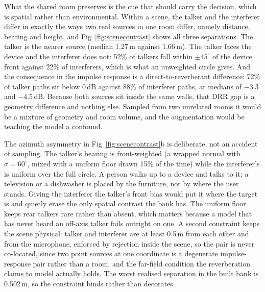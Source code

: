 \documentclass{article}
\begin{document}
What the shared room preserves is the cue that should carry the decision, which is spatial rather than environmental. Within a scene, the talker and the interferer differ in exactly the ways two real sources in one room differ, namely distance, bearing and height, and Fig~\ref{fig:scenecontrast} shows all three separations. The talker is the nearer source (median 1.27\,m against 1.66\,m). The talker faces the device and the interferer does not: 52\% of talkers fall within $\pm 45^\circ$ of the device front against 22\% of interferers, which is what an unweighted circle gives. And the consequence in the impulse response is a direct-to-reverberant difference: 72\% of talker paths sit below 0\,dB against 88\% of interferer paths, at medians of $-3.3$ and $-4.5$\,dB. Because both sources sit inside the same walls, that DRR gap is a geometry difference and nothing else. Sampled from two unrelated rooms it would be a mixture of geometry and room volume, and the augmentation would be teaching the model a confound.

The azimuth asymmetry in Fig~\ref{fig:scenecontrast}b is deliberate, not an accident of sampling. The talker's bearing is front-weighted (a wrapped normal with $\sigma = 60^\circ$, mixed with a uniform floor drawn 15\% of the time) while the interferer's is uniform over the full circle. A person walks up to a device and talks to it; a television or a dishwasher is placed by the furniture, not by where the user stands. Giving the interferer the talker's front bias would put it where the target is and quietly erase the only spatial contrast the bank has. The uniform floor keeps rear talkers rare rather than absent, which matters because a model that has never heard an off-axis talker fails outright on one. A second constraint keeps the scene physical: talker and interferer are at least 0.5\,m from each other and from the microphone, enforced by rejection inside the scene, so the pair is never co-located, since two point sources at one coordinate is a degenerate impulse-response pair rather than a room, and the far-field condition the reverberation claims to model actually holds. The worst realised separation in the built bank is 0.502\,m, so the constraint binds rather than decorates.
\end{document}
